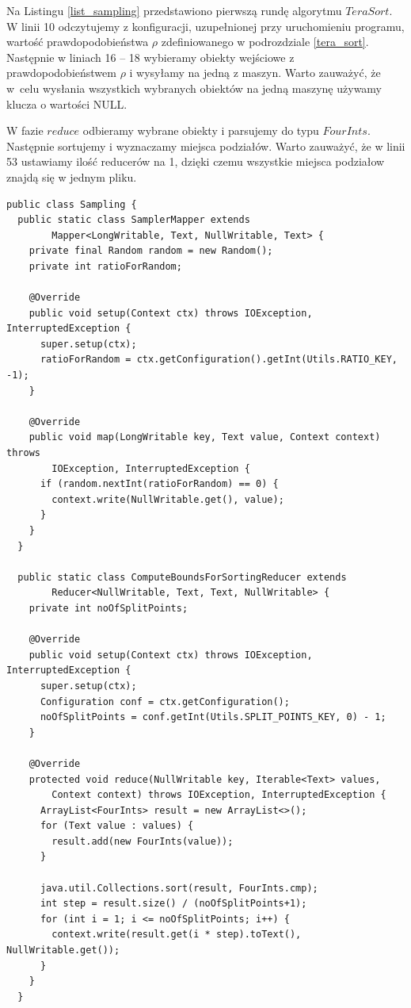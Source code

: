 \documentclass[magisterska]{pracamgr}
\begin{document}
Na Listingu \ref{list_sampling} przedstawiono pierwszą rundę algorytmu \(TeraSort\). W linii 10 odczytujemy z konfiguracji, uzupełnionej przy uruchomieniu programu, wartość prawdopodobieństwa \(\rho\) zdefiniowanego w podrozdziale \ref{tera_sort}. Następnie w liniach 16 -- 18 wybieramy obiekty wejściowe z prawdopodobieństwem \(\rho\) i wysyłamy na jedną z maszyn. Warto zauważyć, że w~celu wysłania wszystkich wybranych obiektów na jedną maszynę używamy klucza o wartości NULL.

W fazie \(reduce\) odbieramy wybrane obiekty i parsujemy do typu \(FourInts\). Następnie sortujemy i wyznaczamy miejsca podziałów. Warto zauważyć, że w linii 53 ustawiamy ilość reducerów na 1, dzięki czemu wszystkie miejsca podziałow znajdą się w jednym pliku.

\begin{lstlisting}[language=SmallJava,firstnumber=1,label=list_sampling,caption=Faza próbkowania danych]
public class Sampling {
  public static class SamplerMapper extends
        Mapper<LongWritable, Text, NullWritable, Text> {
    private final Random random = new Random();
    private int ratioForRandom;

    @Override
    public void setup(Context ctx) throws IOException, InterruptedException {
      super.setup(ctx);
      ratioForRandom = ctx.getConfiguration().getInt(Utils.RATIO_KEY, -1);
    }

    @Override
    public void map(LongWritable key, Text value, Context context) throws
        IOException, InterruptedException {
      if (random.nextInt(ratioForRandom) == 0) {
        context.write(NullWritable.get(), value);
      }
    }
  }

  public static class ComputeBoundsForSortingReducer extends
        Reducer<NullWritable, Text, Text, NullWritable> {
    private int noOfSplitPoints;

    @Override
    public void setup(Context ctx) throws IOException, InterruptedException {
      super.setup(ctx);
      Configuration conf = ctx.getConfiguration();
      noOfSplitPoints = conf.getInt(Utils.SPLIT_POINTS_KEY, 0) - 1;
    }

    @Override
    protected void reduce(NullWritable key, Iterable<Text> values,
        Context context) throws IOException, InterruptedException {
      ArrayList<FourInts> result = new ArrayList<>();
      for (Text value : values) {
        result.add(new FourInts(value));
      }

      java.util.Collections.sort(result, FourInts.cmp);
      int step = result.size() / (noOfSplitPoints+1);
      for (int i = 1; i <= noOfSplitPoints; i++) {
        context.write(result.get(i * step).toText(), NullWritable.get());
      }
    }
  }


\end{lstlisting}
\end{document}
